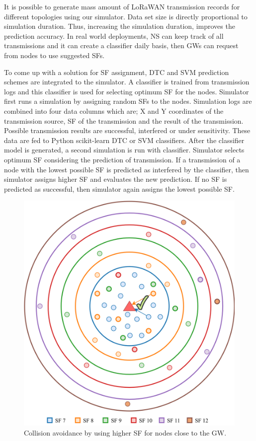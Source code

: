 \documentclass[conference]{IEEEtran}
\begin{document}
\par It is possible to generate mass amount of LoRaWAN transmission records for different topologies using our simulator. Data set size is directly proportional to simulation duration. Thus, increasing the simulation duration, improves the prediction accuracy. In real world deployments, NS can keep track of all transmissions and it can create a classifier daily basis, then GWs can request from nodes to use suggested SFs.

\par To come up with a solution for SF assignment, DTC and SVM prediction schemes are integrated to the simulator. A classifier is trained from transmission logs and this classifier is used for selecting optimum SF for the nodes. Simulator first runs a simulation by assigning random SFs to the nodes. Simulation logs are combined into four data columns which are; X and Y coordinates of the transmission source, SF of the transmission and the result of the transmission. Possible transmission results are successful, interfered or under sensitivity. These data are fed to Python scikit-learn DTC or SVM classifiers. After the classifier model is generated, a second simulation is run with classifier. Simulator selects optimum SF considering the prediction of transmission. If a transmission of a node with the lowest possible SF is predicted as interfered by the classifier, then simulator assigns higher SF and evaluates the new prediction. If no SF is predicted as successful, then simulator again assigns the lowest possible SF.

\begin{figure}
\centering
\includegraphics[width=\linewidth]{collision_solution_single_gw}
\caption{Collision avoidance by using higher SF for nodes close to the GW.}
\label{fig:collision_solution_single_gw}
\end{figure}
\end{document}
